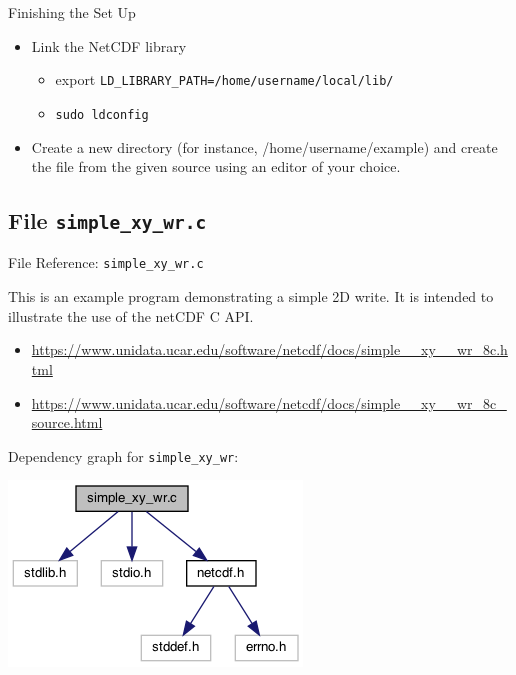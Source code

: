 \documentclass[compress,11pt,xcolor=svgnames,aspectratio=169]{beamer}
\begin{document}
\begin{frame}[fragile]{Finishing the Set Up}

\begin{itemize}
\setlength\itemsep{0.8cm}
  \item Link the NetCDF library\\
  \begin{itemize}
  \setlength\itemsep{0.2cm}
    \item export \verb|LD_LIBRARY_PATH=/home/username/local/lib/|
    \item \verb|sudo ldconfig|
  \end{itemize}
  \item Create a new directory (for instance, /home/username/example) and create the file from the given source using an editor of your choice.

\end{itemize}

\end{frame}

\subsection{File \texttt{simple\_xy\_wr.c}}


\begin{frame}[fragile]{File Reference: \texttt{simple\_xy\_wr.c}}

This is an example program demonstrating a simple 2D write. It is intended to illustrate the use of the netCDF C API.\\[0.3cm]

\begin{itemize}
  \item {\tiny \url{https://www.unidata.ucar.edu/software/netcdf/docs/simple__xy__wr_8c.html}}
  \item {\tiny \url{https://www.unidata.ucar.edu/software/netcdf/docs/simple__xy__wr_8c_source.html}}
\end{itemize}

Dependency graph for \verb|simple_xy_wr|:

\begin{center}
\includegraphics[scale=0.5]{fig/simple__xy__wr_8c__incl}
\end{center}

\end{frame}
\end{document}
